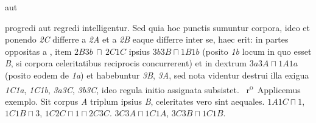 aut 
\protect\rule[0cm]{0mm}{10pt}progredi aut regredi intelligentur. Sed quia hoc  
%
%
punctis sumuntur corpora, ideo et
ponendo \textit{{\scriptsize 2}C} differre a \textit{{\scriptsize 2}A} et a \textit{{\scriptsize 2}B} eaque differre inter se,  
%
%
haec erit: in partes oppositas a
, item ${\scriptstyle \textit{2}}B{\scriptstyle \textit{3}}b\, \sqcap\, {\scriptstyle \textit{2}}C{\scriptstyle \textit{1}}C$ 
%
%
ipsius  
%
${\scriptstyle \textit{3}}b{\scriptstyle \textit{3}}B \sqcap {\scriptstyle \textit{1}}B{\scriptstyle \textit{1}}b$ (posito \textit{{\scriptsize 1}b} locum in quo esset \textit{B}, si corpora celeritatibus reciprocis\protect{} concurrerent) 
et in dextrum
%
${\scriptstyle \textit{3}}a{\scriptstyle \textit{3}}A \sqcap {\scriptstyle \textit{1}}A{\scriptstyle \textit{1}}a$ (posito eodem de \textit{{\scriptsize 1}a}) et habebuntur \textit{{\scriptsize 3}B}, \textit{{\scriptsize 3}A}, sed nota videntur
destrui illa exigua \textit{{\scriptsize 1}C{\scriptsize 1}a}, \textit{{\scriptsize 1}C{\scriptsize 1}b}, \textit{{\scriptsize 3}a{\scriptsize 3}C}, \textit{{\scriptsize 3}b{\scriptsize 3}C}, ideo regula initio assignata subsistet.
\pend \pstart
{}~r\textsuperscript{o}\rbrack\
Applicemus exemplo. Sit corpus \textit{A} triplum ipsius \textit{B}, celeritates vero sint aequales.\pend \pstart
${\scriptstyle \textit{1}}A{\scriptstyle \textit{1}}C \sqcap 1$, ${\scriptstyle \textit{1}}C{\scriptstyle \textit{1}}B \sqcap 3$, ${\scriptstyle \textit{1}}C{\scriptstyle \textit{2}}C \sqcap 1 \sqcap {\scriptstyle \textit{2}}C{\scriptstyle \textit{3}}C$. ${\scriptstyle \textit{3}}C{\scriptstyle \textit{3}}A \sqcap {\scriptstyle \textit{1}}C{\scriptstyle \textit{1}}A$, ${\scriptstyle \textit{3}}C{\scriptstyle \textit{3}}B \sqcap {\scriptstyle \textit{1}}C{\scriptstyle \textit{1}}B$.
